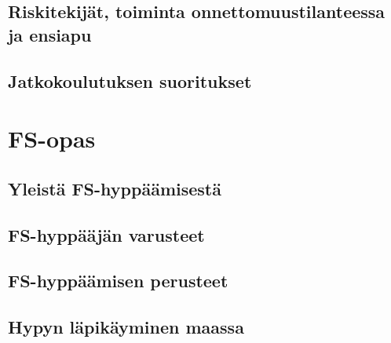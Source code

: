 \documentclass[10pt,twoside,openany,hidelinks]{memoir}
\begin{document}
\chapter{Riskitekijät, toiminta onnettomuustilanteessa ja ensiapu}
\label{riskitekijat-toiminta-onnettomuustilanteessa-ja-ensiapu}
\thispagestyle{headings}
\begin{multicols}{2}
\end{multicols}

\chapter{Jatkokoulutuksen suoritukset}
\label{jatkokoulutuksen-suoritukset}
\thispagestyle{headings}
\begin{multicols}{2}
\end{multicols}

\part{FS-opas}\chapter{Yleistä FS-hyppäämisestä}
\label{yleista-fs-hyppaamisesta}
\thispagestyle{headings}
\begin{multicols}{2}
\end{multicols}

\chapter{FS-hyppääjän varusteet}
\label{fs-hyppaajan-varusteet}
\thispagestyle{headings}
\begin{multicols}{2}
\end{multicols}

\chapter{FS-hyppäämisen perusteet}
\label{fs-hyppaamisen-perusteet}
\thispagestyle{headings}
\begin{multicols}{2}
\end{multicols}

\chapter{Hypyn läpikäyminen maassa}
\label{hypyn-lapikayminen-maassa}
\thispagestyle{headings}
\begin{multicols}{2}
\end{multicols}
\end{document}
